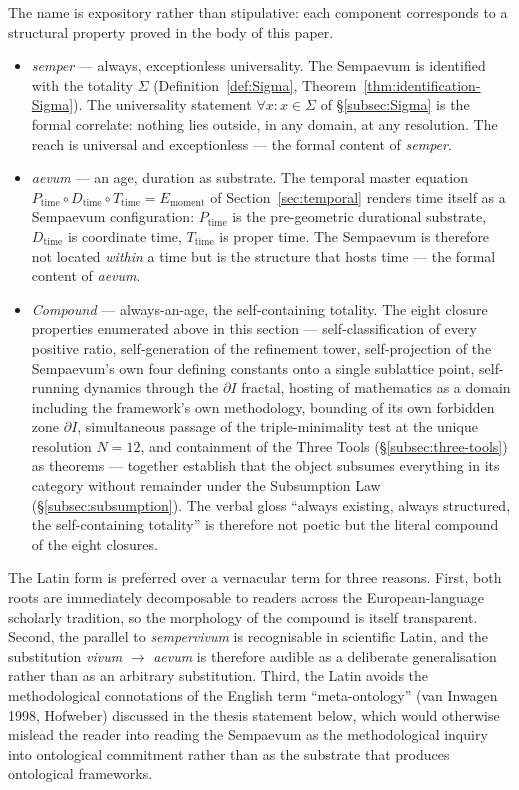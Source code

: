 \documentclass[11pt,a4paper]{article}
\theoremstyle{definition}
\theoremstyle{remark}
\begin{document}
The name is expository rather than stipulative: each component corresponds to a structural property proved in the body of this paper.

\begin{itemize}[leftmargin=*]
\item \emph{semper} --- always, exceptionless universality. The Sempaevum is identified with the totality $\Sigma$ (Definition~\ref{def:Sigma}, Theorem~\ref{thm:identification-Sigma}). The universality statement $\forall x : x \in \Sigma$ of \S\ref{subsec:Sigma} is the formal correlate: nothing lies outside, in any domain, at any resolution. The reach is universal and exceptionless --- the formal content of \emph{semper}.

\item \emph{aevum} --- an age, duration as substrate. The temporal master equation $P_{\text{time}} \circ D_{\text{time}} \circ T_{\text{time}} = E_{\text{moment}}$ of Section~\ref{sec:temporal} renders time itself as a Sempaevum configuration: $P_{\text{time}}$ is the pre-geometric durational substrate, $D_{\text{time}}$ is coordinate time, $T_{\text{time}}$ is proper time. The Sempaevum is therefore not located \emph{within} a time but is the structure that hosts time --- the formal content of \emph{aevum}.

\item \emph{Compound} --- always-an-age, the self-containing totality. The eight closure properties enumerated above in this section --- self-classification of every positive ratio, self-generation of the refinement tower, self-projection of the Sempaevum's own four defining constants onto a single sublattice point, self-running dynamics through the $\partial I$ fractal, hosting of mathematics as a domain including the framework's own methodology, bounding of its own forbidden zone $\partial I$, simultaneous passage of the triple-minimality test at the unique resolution $N=12$, and containment of the Three Tools (\S\ref{subsec:three-tools}) as theorems --- together establish that the object subsumes everything in its category without remainder under the Subsumption Law (\S\ref{subsec:subsumption}). The verbal gloss ``always existing, always structured, the self-containing totality'' is therefore not poetic but the literal compound of the eight closures.
\end{itemize}

The Latin form is preferred over a vernacular term for three reasons. First, both roots are immediately decomposable to readers across the European-language scholarly tradition, so the morphology of the compound is itself transparent. Second, the parallel to \emph{sempervivum} is recognisable in scientific Latin, and the substitution \emph{vivum} $\to$ \emph{aevum} is therefore audible as a deliberate generalisation rather than as an arbitrary substitution. Third, the Latin avoids the methodological connotations of the English term ``meta-ontology'' (van Inwagen 1998, Hofweber) discussed in the thesis statement below, which would otherwise mislead the reader into reading the Sempaevum as the methodological inquiry into ontological commitment rather than as the substrate that produces ontological frameworks.
\end{document}
